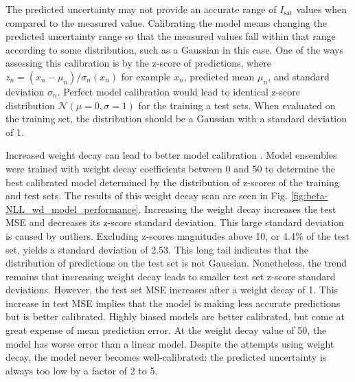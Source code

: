 The predicted uncertainty may not provide an accurate range of $I_\text{sat}$ values when compared to the measured value. Calibrating the model means changing the predicted uncertainty range so that the measured values fall within that range according to some distribution, such as a Gaussian in this case. One of the ways assessing this calibration is by the z-score of predictions, where $z_n= \left(x_n - \mu_n \right) / \sigma_n(x_n)$ for example $x_n$, predicted mean $\mu_n$, and standard deviation $\sigma_n$. Perfect model calibration would lead to identical z-score distribution $\mathcal{N}(\mu=0, \sigma=1)$ for the training a test sets. When evaluated on the training set, the distribution should be a Gaussian with a standard deviation of 1.

Increased weight decay can lead to better model calibration \cite{guo_calibration_2017}. Model ensembles were trained with weight decay coefficients between 0 and 50 to determine the best calibrated model determined by the distribution of z-scores of the training and test sets. The results of this weight decay scan are seen in Fig. \ref{fig:beta-NLL_wd_model_performance}. Increasing the weight decay increases the test MSE and decreases its z-score standard deviation. This large standard deviation is caused by outliers. Excluding z-scores magnitudes above 10, or 4.4\% of the test set, yields a standard deviation of 2.53. This long tail indicates that the distribution of predictions on the test set is not Gaussian. Nonetheless, the trend remains that increasing weight decay leads to smaller test set z-score standard deviations. However, the test set MSE increases after a weight decay of 1. This increase in test MSE implies that the model is making less accurate predictions but is better calibrated. Highly biased models are better calibrated, but come at great expense of mean prediction error. At the weight decay value of 50, the model has worse error than a linear model. Despite the attempts using weight decay, the model never becomes well-calibrated: the predicted uncertainty is always too low by a factor of 2 to 5. 

 

